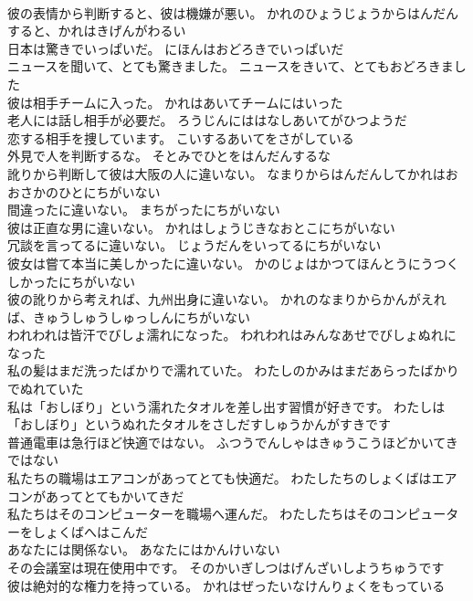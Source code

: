 \documentclass[8pt]{extreport}
\begin{document}
\begin{CJK}{UTF8}{min}
\\	彼の表情から判断すると、彼は機嫌が悪い。	かれのひょうじょうからはんだんすると、かれはきげんがわるい 
\\	日本は驚きでいっぱいだ。	にほんはおどろきでいっぱいだ 
\\	ニュースを聞いて、とても驚きました。	ニュースをきいて、とてもおどろきました 
\\	彼は相手チームに入った。	かれはあいてチームにはいった 
\\	老人には話し相手が必要だ。	ろうじんにははなしあいてがひつようだ 
\\	恋する相手を捜しています。	こいするあいてをさがしている 
\\	外見で人を判断するな。	そとみでひとをはんだんするな 
\\	訛りから判断して彼は大阪の人に違いない。	なまりからはんだんしてかれはおおさかのひとにちがいない 
\\	間違ったに違いない。	まちがったにちがいない 
\\	彼は正直な男に違いない。	かれはしょうじきなおとこにちがいない 
\\	冗談を言ってるに違いない。	じょうだんをいってるにちがいない 
\\	彼女は嘗て本当に美しかったに違いない。	かのじょはかつてほんとうにうつくしかったにちがいない 
\\	彼の訛りから考えれば、九州出身に違いない。	かれのなまりからかんがえれば、きゅうしゅうしゅっしんにちがいない 
\\	われわれは皆汗でびしょ濡れになった。	われわれはみんなあせでびしょぬれになった 
\\	私の髪はまだ洗ったばかりで濡れていた。	わたしのかみはまだあらったばかりでぬれていた 
\\	私は「おしぼり」という濡れたタオルを差し出す習慣が好きです。	わたしは「おしぼり」というぬれたタオルをさしだすしゅうかんがすきです 
\\	普通電車は急行ほど快適ではない。	ふつうでんしゃはきゅうこうほどかいてきではない 
\\	私たちの職場はエアコンがあってとても快適だ。	わたしたちのしょくばはエアコンがあってとてもかいてきだ 
\\	私たちはそのコンピューターを職場へ運んだ。	わたしたちはそのコンピューターをしょくばへはこんだ 
\\	あなたには関係ない。	あなたにはかんけいない 
\\	その会議室は現在使用中です。	そのかいぎしつはげんざいしようちゅうです 
\\	彼は絶対的な権力を持っている。	かれはぜったいなけんりょくをもっている 

\end{CJK}
\end{document}
